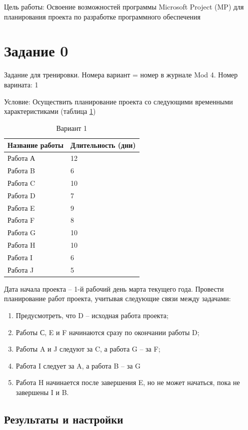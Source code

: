 Цель работы: Освоение возможностей программы Microsoft Project (MP) для планирования проекта по разработке программного обеспечения

\section{Задание 0}

Задание для тренировки. Номера вариант = номер в журнале Mod 4.
Номер варината: 1

Условие: Осуществить планирование проекта со следующими временными
характеристиками (таблица \ref{tab:var1})

\begin{table}[H]
	\caption{Вариант 1}
	\label{tab:var1}
	\begin{tabular}{|l|l|}
		\hline
		Название работы & Длительность (дни) \\
		\hline
		Работа А & 12 \\
		\hline
		Работа B & 6 \\
		\hline
		Работа C & 10 \\
		\hline
		Работа D & 7 \\
		\hline
		Работа E & 9 \\
		\hline
		Работа F & 8 \\
		\hline
		Работа G & 10 \\
		\hline
		Работа H & 10 \\
		\hline
		Работа I & 6 \\
		\hline
		Работа J & 5 \\
		\hline
	\end{tabular}
\end{table}

Дата начала проекта – 1-й рабочий день марта текущего года.
Провести планирование работ проекта, учитывая следующие связи между задачами:
\begin{enumerate}
	\item Предусмотреть, что D – исходная работа проекта;
	\item Работы С, E и F начинаются сразу по окончании работы D;
	\item Работы A и J следуют за C, а работа G – за F;
	\item Работа I следует за A, а работа B – за G
	\item Работа H начинается после завершения E, но не может начаться, пока не завершены I и B.
\end{enumerate}

\subsection{Результаты и настройки}

